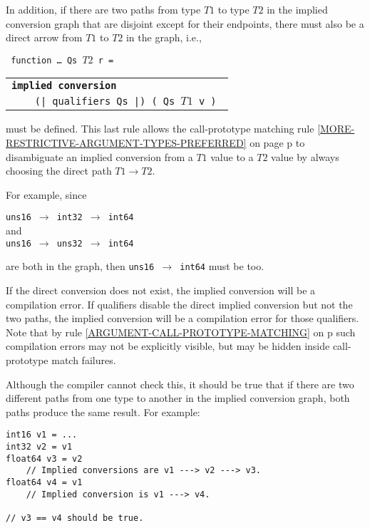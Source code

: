 \documentclass[12pt]{article}
\makeatletter
\newcommand{\TT}[1]{{\tt \bfseries #1}}
\newcommand{\ttkey}[1]{\TT{#1}\index{#1@{\tt #1}}}
\newcommand{\pagref}[1]{p\pageref{#1}}
\newcommand{\TS}{\hspace*{0in}\tt}
\newcommand{\CNV}{\longrightarrow}	%
\newenvironment{indpar}[1][0.3in]%
	{\begin{list}{}%
		     {\setlength{\itemsep}{0in}%
		      \setlength{\topsep}{0in}%
		      \setlength{\parsep}{1ex}%
		      \setlength{\labelwidth}{#1}%
		      \setlength{\leftmargin}{#1}%
		      \addtolength{\leftmargin}{\labelsep}}%
	 \item}%
	{\end{list}}
\makeatother
\begin{document}
In addition, if there are two paths from type $T1$
to type $T2$ in the implied conversion graph that
are disjoint except for their endpoints, there must also
be a direct arrow from $T1$ to $T2$ in the graph, i.e.,
\begin{center} \tt
function \ldots~Qs~$T2$ r =
		      \begin{tabular}[t]{@{}l@{}}
                      \ttkey{implied conversion} \\
                      \TS~~~~(| qualifiers Qs |) ( Qs~$T1$ v )
                      \end{tabular}
\label{IMPLIED-CONVERSION}
\end{center}
must be defined.
This last rule
allows the call-prototype matching rule
\ref{MORE-RESTRICTIVE-ARGUMENT-TYPES-PREFERRED}
on page \pagref{MORE-RESTRICTIVE-ARGUMENT-TYPES-PREFERRED}
to disambiguate an implied conversion from a $T1$ value to
a $T2$ value by always choosing the direct path $T1\CNV T2$.

For example, since
\begin{center}
{\tt uns16 $\CNV$ int32 $\CNV$ int64} \\
and \\
{\tt uns16 $\CNV$ uns32 $\CNV$ int64}
\end{center}
are both in the graph,
then {\tt uns16 $\CNV$ int64} must be too.

If the direct conversion does not exist,
the implied conversion will be a compilation error.
If qualifiers disable the direct implied conversion but
not the two paths, the implied conversion will be a compilation
error for those qualifiers.
Note that by rule
\ref{ARGUMENT-CALL-PROTOTYPE-MATCHING}
on \pagref{ARGUMENT-CALL-PROTOTYPE-MATCHING}
such compilation errors may not be explicitly visible,
but may be hidden inside call-prototype match failures.

Although the compiler cannot check this, it should be true
that if there are two different paths from one type to another
in the implied conversion graph, both paths produce the same
result.  For example:
\begin{indpar}\begin{verbatim}
int16 v1 = ...
int32 v2 = v1
float64 v3 = v2
    // Implied conversions are v1 ---> v2 ---> v3.
float64 v4 = v1
    // Implied conversion is v1 ---> v4.

// v3 == v4 should be true.
\end{verbatim}\end{indpar}
\end{document}
